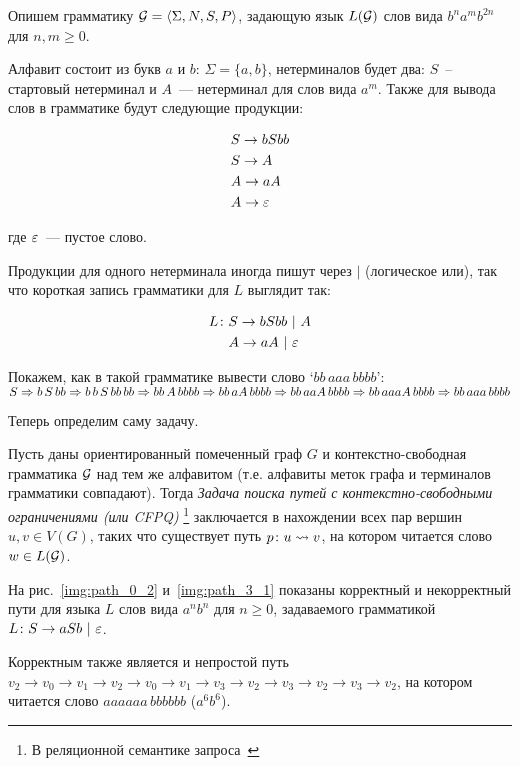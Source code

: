 \begin{example}
  Опишем грамматику $\mathcal{G} = \langle \Sigma, N, S, P \rangle$, задающую язык $L(\mathcal{G})$ слов вида $b^n a^m b^{2n}$ для $n, m \ge 0$.

  Алфавит состоит из букв $a$ и $b$: $\Sigma = \{ a, b \}$, нетерминалов будет два: $S$~-- стартовый нетерминал и $A$~--- нетерминал для слов вида $a^m$. Также для вывода слов в грамматике будут следующие продукции:

  \begin{align*}
    &S \rightarrow b S bb \\
    &S \rightarrow A \\
    &A \rightarrow a A \\
    &A \rightarrow \varepsilon
  \end{align*}

  где $\varepsilon$~--- пустое слово.

  Продукции для одного нетерминала иногда пишут через $|$ (логическое или), так что короткая запись грамматики для $L$ выглядит так:

  \begin{align*}
    L \colon &S \rightarrow b S bb ~|~ A \\
    &A \rightarrow aA ~|~ \varepsilon
  \end{align*}

  Покажем, как в такой грамматике вывести слово `$bb\,aaa\,bbbb$':\\ $S \Rightarrow b\,S\,bb \Rightarrow  b\,b\,S\,bb\,bb \Rightarrow bb\,A\,bbbb \Rightarrow bb\,aA\,bbbb \Rightarrow bb\,aaA\,bbbb \Rightarrow bb\,aaaA\,bbbb \Rightarrow bb\,aaa\,bbbb$

\end{example}

Теперь определим саму задачу.

\begin{definition}
  Пусть даны ориентированный помеченный граф $G$ и контекстно-свободная грамматика $\mathcal{G}$ над тем же алфавитом (т.е. алфавиты меток графа и терминалов грамматики совпадают).
  Тогда \textit{Задача поиска путей с контекстно-свободными ограничениями (или CFPQ)} \footnote{В реляционной семантике запроса~\cite{Hellings16}} заключается в нахождении всех пар вершин $u, v \in V(G)$, таких что существует путь $p \colon u \rightsquigarrow v$, на котором читается слово $w \in L(\mathcal{G})$.

\end{definition}

\begin{example}
  На рис.~\ref{img:path_0_2} и~\ref{img:path_3_1} показаны корректный и некорректный пути для языка $L$ слов вида $a^n b^n$ для $n \ge 0$, задаваемого грамматикой $L \colon S \rightarrow aSb ~|~ \varepsilon$.

  Корректным также является и непростой путь $v_2 \to v_0 \to v_1 \to v_2 \to v_0 \to v_1 \to v_3 \to v_2 \to v_3 \to v_2 \to v_3 \to v_2$, на котором читается слово $aaaaaa\,bbbbbb$ ($a^6 b^6$).
\end{example}


